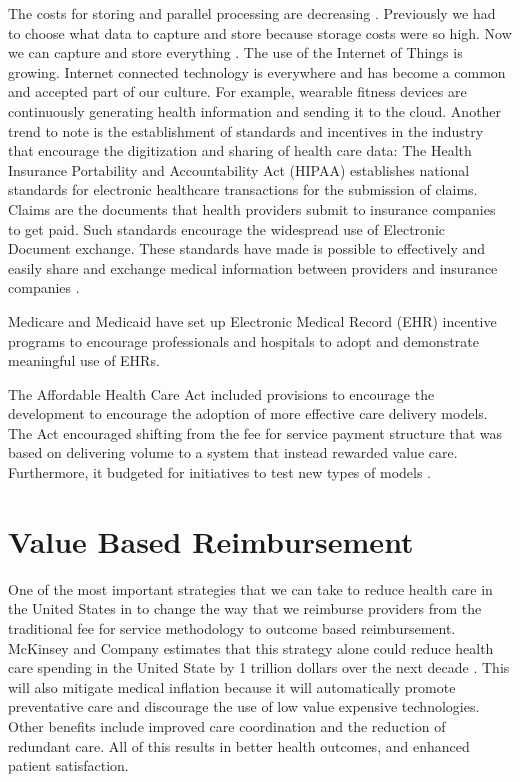 \documentclass[sigconf]{acmart}
\begin{document}
The costs for storing and parallel processing are decreasing \cite{www-google-McDonald}. Previously we had to choose what data to capture and store because storage costs were so high. Now we can capture and store everything \cite{www-google-hadoop}.
The use of the Internet of Things is growing. Internet connected technology is everywhere and has become a common and accepted part of our culture.  For example, wearable fitness devices are continuously generating health information and sending it to the cloud. 
Another trend to note is the establishment of standards and incentives in the industry that encourage the digitization and sharing of health care data: 
The Health Insurance Portability and Accountability Act (HIPAA) establishes national standards for electronic healthcare transactions for the submission of claims. Claims are the documents that health providers submit to insurance companies to get paid. Such standards encourage the widespread use of Electronic Document exchange. These standards have made is possible to effectively and easily share and exchange medical information between providers and insurance companies \cite{www-google-McDonald}.

Medicare and Medicaid have set up Electronic Medical Record (EHR) incentive programs to encourage professionals and hospitals to adopt and demonstrate meaningful use of EHRs.

The Affordable Health Care Act included provisions to encourage the development to encourage the adoption of more effective care delivery models. The Act encouraged shifting from the fee for service payment structure that was based on delivering volume to a system that instead rewarded value care. Furthermore, it budgeted for initiatives to test new types of models \cite{www-google-ACA}.  


\section{Value Based Reimbursement}
One of the most important strategies that we can take to reduce health care in the United States in to change the way that we reimburse providers from the traditional fee for service methodology to outcome based reimbursement.  McKinsey and Company estimates that this strategy alone could reduce health care spending in the United State by 1 trillion dollars over the next decade \cite{www-google-trillion}.  This will also mitigate medical inflation because it will automatically promote preventative care and discourage the use of low value expensive technologies.  Other benefits include   improved care coordination and the reduction of redundant care.  All of this results in better health outcomes, and enhanced patient satisfaction.
\end{document}
